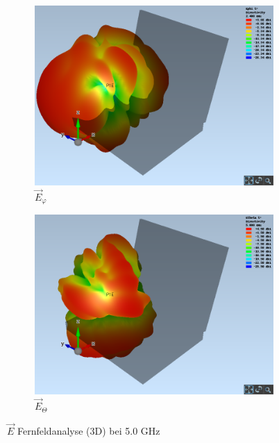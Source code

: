\begin{figure}[h!]
	\begin{subfigure}[b]{0.48\textwidth}
		\includegraphics[width=1\textwidth]{../fig/plt/crazy_stuff_l4_pcb_v2c_laptop_1a_105_5ghz_3d_farfield_ephi_xyz.png}
		\caption{$\vec{E}_{\varphi}$}
	\end{subfigure}
	\begin{subfigure}[b]{0.48\textwidth}
		\includegraphics[width=1\textwidth]{../fig/plt/crazy_stuff_l4_pcb_v2c_laptop_1a_105_5ghz_3d_farfield_etheta_xyz.png}
		\caption{$\vec{E}_{\Theta}$}
	\end{subfigure}
	\caption{$\vec{E}$ Fernfeldanalyse (3D) bei 5.0 GHz}
\end{figure}


